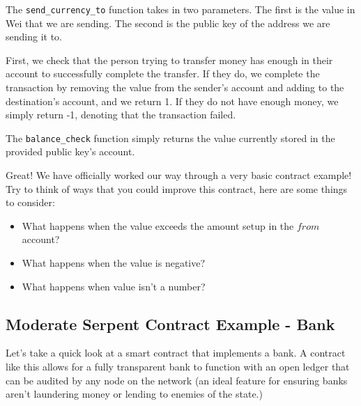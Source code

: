\documentclass[12pt]{article}
\begin{document}

The \texttt{send\_currency\_to} function takes in two parameters. The first is the value in Wei that we are sending. The second is the public key of the address we are sending it to. 

First, we check that the person trying to transfer money has enough in their account to successfully complete the transfer. If they do, we complete the transaction by removing the value from the sender's account and adding to the destination's account, and we return 1. If they do not have enough money, we simply return -1, denoting that the transaction failed. 

The \texttt{balance\_check} function simply returns the value currently stored in the provided public key's account. 

Great! We have officially worked our way through a very basic contract example! Try to think of ways that you could improve this contract, here are some things to consider:

\begin{itemize}
\item What happens when the value exceeds the amount setup in the $from$ account?
\item What happens when the value is negative?
\item What happens when value isn't a number?
\end{itemize}

\subsection{Moderate Serpent Contract Example - Bank}

Let's take a quick look at a smart contract that implements a bank. A contract like this allows for a fully transparent bank to function with an open ledger that can be audited by any node on the network (an ideal feature for ensuring banks aren't laundering money or lending to enemies of the state.)
\end{document}

